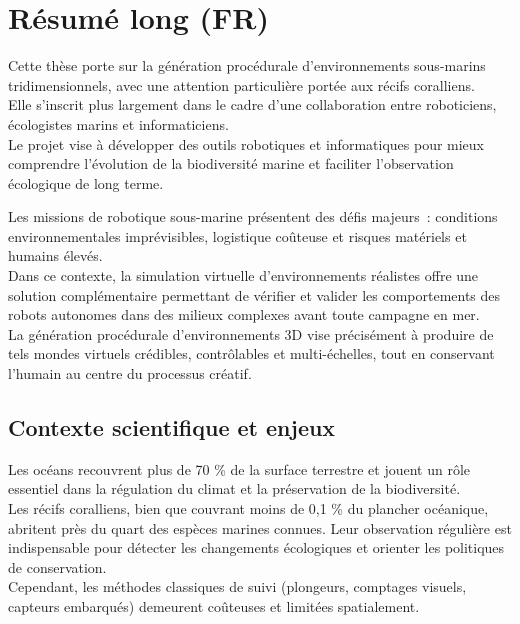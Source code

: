 \chapter*{Résumé long (FR)}

Cette thèse porte sur la génération procédurale d'environnements sous-marins tridimensionnels, avec une attention particulière portée aux récifs coralliens. \\
Elle s'inscrit plus largement dans le cadre d'une collaboration entre roboticiens, écologistes marins et informaticiens. \\
Le projet vise à développer des outils robotiques et informatiques pour mieux comprendre l'évolution de la biodiversité marine et faciliter l'observation écologique de long terme.

Les missions de robotique sous-marine présentent des défis majeurs~: conditions environnementales imprévisibles, logistique coûteuse et risques matériels et humains élevés. \\
Dans ce contexte, la simulation virtuelle d'environnements réalistes offre une solution complémentaire permettant de vérifier et valider les comportements des robots autonomes dans des milieux complexes avant toute campagne en mer. \\
La génération procédurale d'environnements 3D vise précisément à produire de tels mondes virtuels crédibles, contrôlables et multi-échelles, tout en conservant l'humain au centre du processus créatif.

\section*{Contexte scientifique et enjeux}
Les océans recouvrent plus de 70 \% de la surface terrestre et jouent un rôle essentiel dans la régulation du climat et la préservation de la biodiversité. \\
Les récifs coralliens, bien que couvrant moins de 0,1 \% du plancher océanique, abritent près du quart des espèces marines connues. Leur observation régulière est indispensable pour détecter les changements écologiques et orienter les politiques de conservation. \\
Cependant, les méthodes classiques de suivi (plongeurs, comptages visuels, capteurs embarqués) demeurent coûteuses et limitées spatialement.

